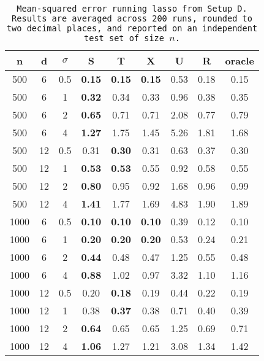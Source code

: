 \begin{table}[ht]
\centering
\begin{tabular}{ccccccccc}
  \hline
n & d & $\sigma$ & S & T & X & U & R & oracle \\ 
  \hline
500 & 6 & 0.5 & \bf 0.15 & \bf 0.15 & \bf 0.15 &  0.53 & 0.18 & 0.15 \\ 
  500 & 6 & 1 & \bf 0.32 & 0.34 & 0.33 &  0.96 & 0.38 & 0.35 \\ 
  500 & 6 & 2 & \bf 0.65 & 0.71 & 0.71 &  2.08 & 0.77 & 0.79 \\ 
  500 & 6 & 4 & \bf 1.27 & 1.75 & 1.45 &  5.26 & 1.81 & 1.68 \\ 
  500 & 12 & 0.5 & 0.31 & \bf 0.30 & 0.31 &  0.63 & 0.37 & 0.30 \\ 
  500 & 12 & 1 & \bf 0.53 & \bf 0.53 & 0.55 &  0.92 & 0.58 & 0.55 \\ 
  500 & 12 & 2 & \bf 0.80 & 0.95 & 0.92 &  1.68 & 0.96 & 0.99 \\ 
  500 & 12 & 4 & \bf 1.41 & 1.77 & 1.69 &  4.83 & 1.90 & 1.89 \\ 
  1000 & 6 & 0.5 & \bf 0.10 & \bf 0.10 & \bf 0.10 &  0.39 & 0.12 & 0.10 \\ 
  1000 & 6 & 1 & \bf 0.20 & \bf 0.20 & \bf 0.20 &  0.53 & 0.24 & 0.21 \\ 
  1000 & 6 & 2 & \bf 0.44 & 0.48 & 0.47 &  1.25 & 0.55 & 0.48 \\ 
  1000 & 6 & 4 & \bf 0.88 & 1.02 & 0.97 &  3.32 & 1.10 & 1.16 \\ 
  1000 & 12 & 0.5 & 0.20 & \bf 0.18 & 0.19 &  0.44 & 0.22 & 0.19 \\ 
  1000 & 12 & 1 & 0.38 & \bf 0.37 & 0.38 &  0.71 & 0.40 & 0.39 \\ 
  1000 & 12 & 2 & \bf 0.64 & 0.65 & 0.65 &  1.25 & 0.69 & 0.71 \\ 
  1000 & 12 & 4 & \bf 1.06 & 1.27 & 1.21 &  3.08 & 1.34 & 1.42 \\ 
   \hline
\end{tabular}
\caption{\tt Mean-squared error running \texttt{lasso} from Setup D. Results are averaged across 200 runs, rounded to two decimal places, and reported on an independent test set of size $n$.} 
\label{table:setup4}
\end{table}
